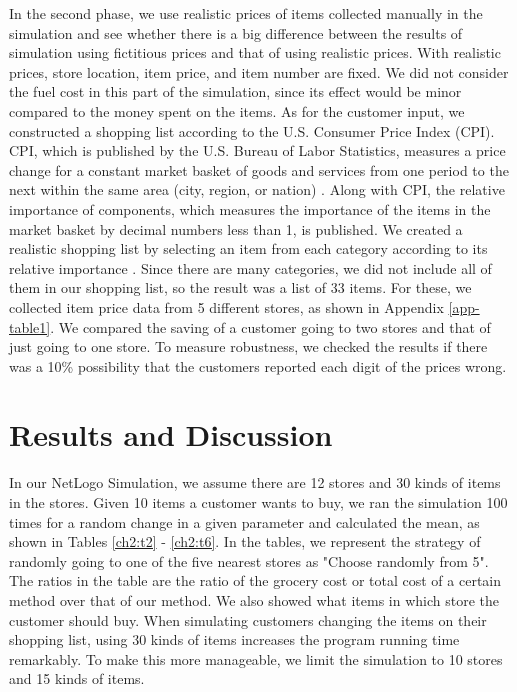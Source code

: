 In the second phase, we use realistic prices of items collected manually in the simulation and see whether there is a big difference between the results of simulation using fictitious prices and that of using realistic prices. With realistic prices, store location, item price, and item number are fixed. We did not consider the fuel cost in this part of the simulation, since its effect would be minor compared to the money spent on the items. As for the customer input, we constructed a shopping list according to the U.S. Consumer Price Index (CPI). CPI, which is published by the U.S. Bureau of Labor Statistics, measures a price change for a constant market basket of goods and services from one period to the next within the same area (city, region, or nation) \cite{blsglossary}. Along with CPI, the relative importance of components, which measures the importance of the items in the market basket by decimal numbers less than 1, is published. We created a realistic shopping list by selecting an item from each category according to its relative importance \cite{relativeimportance}. Since there are many categories, we did not include all of them in our shopping list, so the result was a list of 33 items. For these, we collected item price data from 5 different stores, as shown in Appendix \ref{app-table1}. We compared the saving of a customer going to two stores and that of just going to one store. To measure robustness, we checked the results if there was a 10\% possibility that the customers reported each digit of the prices wrong.

\section{Results and Discussion}

In our NetLogo Simulation, we assume there are 12 stores and 30 kinds of items in the stores. Given 10 items a customer wants to buy, we ran the simulation 100 times for a random change in a given parameter and calculated the mean, as shown in Tables \ref{ch2:t2} - \ref{ch2:t6}. In the tables, we represent the strategy of randomly going to one of the five nearest stores as "Choose randomly from 5". The ratios in the table are the ratio of the grocery cost or total cost of a certain method over that of our method. We also showed what items in which store the customer should buy. When simulating customers changing the items on their shopping list, using 30 kinds of items increases the program running time remarkably. To make this more manageable, we limit the simulation to 10 stores and 15 kinds of items.

